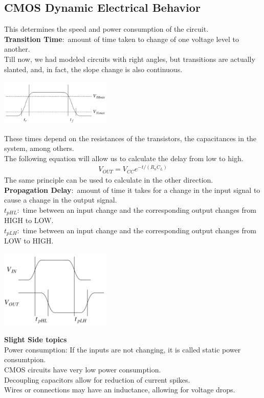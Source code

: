 \documentclass[nobib]{tufte-handout}
\newcommand{\defn}[2]{\noindent\textbf{#1}:\ #2}
\begin{document}
    \subsection{CMOS Dynamic Electrical Behavior}
    This determines the speed and power consumption of the circuit.\\
    \defn{Transition Time}{amount of time taken to change of one voltage level to
        another.}\\ Till now, we had modeled circuits with right angles, but
    transitions are actually slanted, and, in fact, the slope change is also
    continuous.\\
    \begin{center}
        \includegraphics[width = 200px]{images/tdelaygraph.png}
    \end{center}
    These times depend on the resistances of the transistors, the capacitances in the system, among others.\\
    The following equation will allow us to calculate the delay from low to high.
    \begin{align*}
        V_{OUT} = V_{CC}e^{-t/(R_n C_L)}
    \end{align*}
    The same principle can be used to calculate in the other direction.\\
    \defn{Propagation Delay}{amount of time it takes for a change in the input signal to cause a change in the output signal.}\\
    \defn{$t_{pHL}$}{time between an input change and the corresponding output changes from HIGH to LOW.}\\
    \defn{$t_{pLH}$}{time between an input change and the corresponding output changes from LOW to HIGH.}\\
    \begin{center}
        \includegraphics[width = 200px]{images/propdelaygraph.png}
    \end{center}
    \begin{mdframed}
        \textbf{Slight Side topics}\\
        Power consumption:  If the inputs are not changing, it is called static power consumtpion.\\
        CMOS circuits have very low power consumption.\\
        Decoupling capacitors allow for reduction of current spikes.\\
        Wires or connections may have an inductance, allowing for voltage drops.\\
    \end{mdframed}
\end{document}
